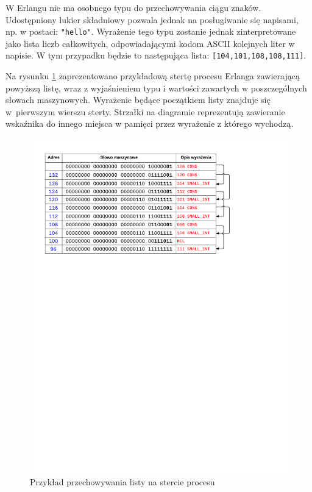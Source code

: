 W Erlangu nie ma osobnego typu do przechowywania ciągu znaków. Udostępniony lukier składniowy pozwala jednak na posługiwanie się napisami, np. w postaci: \texttt{"hello"}. Wyrażenie tego typu zostanie jednak zinterpretowane jako lista liczb całkowitych, odpowiadającymi kodom ASCII kolejnych liter w napisie. W tym przypadku będzie to następująca lista: \texttt{[104,101,108,108,111]}.

Na rysunku \ref{fig:listonheap} zaprezentowano przykładową stertę procesu Erlanga zawierającą powyższą listę, wraz z wyjaśnieniem typu i wartości zawartych w poszczególnych słowach maszynowych. 
Wyrażenie będące początkiem listy znajduje się w~pierwszym wierszu sterty.
Strzałki na diagramie reprezentują zawieranie wskaźnika do innego miejsca w pamięci przez wyrażenie z którego wychodzą.

\begin{figure}[h]
\centerline{\includegraphics[scale=1, clip, trim=10mm 180mm 45mm 10mm]{list_on_heap}}
\caption{Przykład przechowywania listy na stercie procesu}
\label{fig:listonheap}
\end{figure}

